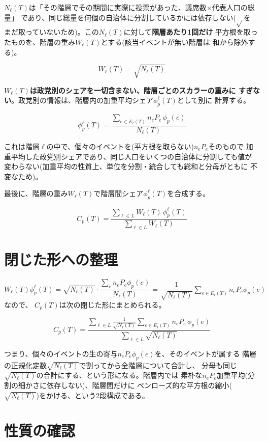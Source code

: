 \documentclass[a4paper,11pt]{ltjsarticle}
\begin{document}
$N_\ell(T)$は「その階層でその期間に実際に投票があった、議席数×代表人口の総量」
であり、同じ総量を何個の自治体に分割しているかには依存しない($\sqrt{}$を
まだ取っていないため)。この$N_\ell(T)$に対して\textbf{階層あたり1回だけ}
平方根を取ったものを、階層の重み$W_\ell(T)$とする(該当イベントが無い階層は
和から除外する)。

$$W_\ell(T) = \sqrt{N_\ell(T)}$$

\textbf{$W_\ell(T)$は政党別のシェアを一切含まない、階層ごとのスカラーの重みに
すぎない}。政党別の情報は、階層内の加重平均シェア$\phi_p^\ell(T)$として別に
計算する。

$$\phi_p^\ell(T) = \frac{\displaystyle\sum_{e\in E_\ell(T)} n_eP_e\,\phi_p(e)}{N_\ell(T)}$$

これは階層$\ell$の中で、個々のイベントを(平方根を取らない)$n_eP_e$そのもので
加重平均した政党別シェアであり、同じ人口をいくつの自治体に分割しても値が
変わらない(加重平均の性質上、単位を分割・統合しても総和と分母がともに
不変なため)。

最後に、階層の重み$W_\ell(T)$で階層間シェア$\phi_p^\ell(T)$を合成する。

$$C_p(T) = \frac{\displaystyle\sum_{\ell\in L} W_\ell(T)\,\phi_p^\ell(T)}
                  {\displaystyle\sum_{\ell\in L} W_\ell(T)}$$

\section{閉じた形への整理}

$W_\ell(T)\phi_p^\ell(T) = \sqrt{N_\ell(T)}\cdot\dfrac{\sum_e n_eP_e\phi_p(e)}{N_\ell(T)}
= \dfrac{1}{\sqrt{N_\ell(T)}}\sum_{e\in E_\ell(T)} n_eP_e\phi_p(e)$なので、
$C_p(T)$は次の閉じた形にまとめられる。

$$C_p(T) = \frac{\displaystyle\sum_{\ell\in L} \frac{1}{\sqrt{N_\ell(T)}}
                  \sum_{e\in E_\ell(T)} n_eP_e\,\phi_p(e)}
                  {\displaystyle\sum_{\ell\in L} \sqrt{N_\ell(T)}}$$

つまり、個々のイベントの生の寄与$n_eP_e\phi_p(e)$を、そのイベントが属する
階層の正規化定数$\sqrt{N_\ell(T)}$で割ってから全階層について合計し、
分母も同じ$\sqrt{N_\ell(T)}$の合計にする、という形になる。階層内では
素朴な$n_eP_e$加重平均(分割の細かさに依存しない)、階層間だけに
ペンローズ的な平方根の縮小($\sqrt{N_\ell(T)}$)をかける、という2段構成である。

\section{性質の確認}
\end{document}
